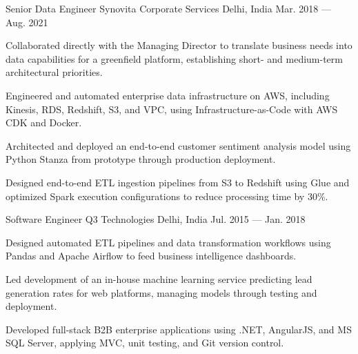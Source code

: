 \begin{cventries}
  \cventry
  {Senior Data Engineer} %
  {Synovita Corporate Services} %
  {Delhi, India} %
  {Mar. 2018 --- Aug. 2021} %
  {
    \begin{cvitems} %
    \item {Collaborated directly with the Managing Director to translate business needs into data capabilities for a greenfield platform, establishing short- and medium-term architectural priorities.}
    \item {Engineered and automated enterprise data infrastructure on AWS, including Kinesis, RDS, Redshift, S3, and VPC, using Infrastructure-as-Code with AWS CDK and Docker.}
    \item {Architected and deployed an end-to-end customer sentiment analysis model using Python Stanza from prototype through production deployment.}
    \item {Designed end-to-end ETL ingestion pipelines from S3 to Redshift using Glue and optimized Spark execution configurations to reduce processing time by 30\%.}
    \end{cvitems}
  }

  \cventry
  {Software Engineer} %
  {Q3 Technologies} %
  {Delhi, India} %
  {Jul. 2015 --- Jan. 2018} %
  {
    \begin{cvitems} %
    \item {Designed automated ETL pipelines and data transformation workflows using Pandas and Apache Airflow to feed business intelligence dashboards.}
    \item {Led development of an in-house machine learning service predicting lead generation rates for web platforms, managing models through testing and deployment.}
    \item {Developed full-stack B2B enterprise applications using .NET, AngularJS, and MS SQL Server, applying MVC, unit testing, and Git version control.}
    \end{cvitems}
  }
\end{cventries}
